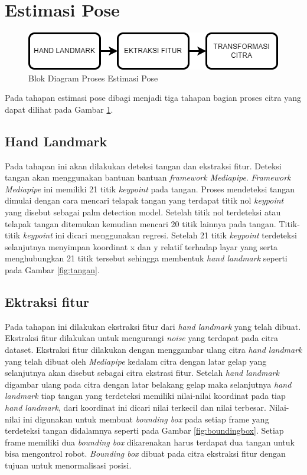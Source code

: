 \section{Estimasi Pose}

\begin{figure}[H]
  \centering
  \includegraphics[width=0.7\linewidth]{../Gambar/Poseestimasi.png}
  \caption{Blok Diagram Proses Estimasi Pose}
  \label{fig:estimasipose}
\end{figure}

Pada tahapan estimasi pose dibagi menjadi tiga tahapan bagian proses citra yang dapat dilihat pada Gambar \ref{fig:estimasipose}. 

\subsection{Hand Landmark}
Pada tahapan ini akan dilakukan deteksi tangan dan ekstraksi fitur. Deteksi tangan akan menggunakan bantuan bantuan \emph{framework Mediapipe}. \emph{Framework Mediapipe} ini memiliki 21 titik  \emph{keypoint} pada tangan. Proses mendeteksi tangan dimulai dengan cara mencari telapak tangan yang terdapat titik nol \emph{keypoint} yang disebut sebagai palm detection model. Setelah titik nol terdeteksi atau telapak tangan ditemukan kemudian mencari 20 titik lainnya pada tangan. Titik-titik \emph{keypoint} ini dicari menggunakan regresi. Setelah 21 titik \emph{keypoint} terdeteksi selanjutnya menyimpan koordinat x dan y relatif terhadap layar yang serta menghubungkan 21 titik tersebut sehingga membentuk \emph{hand landmark} seperti pada Gambar \ref{fig:tangan}. 

\subsection{Ektraksi fitur}
Pada tahapan ini dilakukan ekstraksi fitur dari \emph{hand landmark} yang telah dibuat. Ekstraksi fitur dilakukan untuk mengurangi \emph{noise} yang terdapat pada citra dataset. Ekstraksi fitur dilakukan dengan menggambar ulang citra \emph{hand landmark} yang telah dibuat oleh \emph{Mediapipe} kedalam citra dengan latar gelap yang selanjutnya akan disebut sebagai citra ekstrasi fitur. Setelah \emph{hand landmark} digambar ulang pada citra dengan latar belakang gelap maka selanjutnya \emph{hand landmark} tiap tangan yang terdeteksi memiliki nilai-nilai koordinat pada tiap \emph{hand landmark}, dari koordinat ini dicari nilai terkecil dan nilai terbesar.  Nilai-nilai ini digunakan untuk membuat \emph{bounding box} pada setiap frame yang terdeteksi tangan didalamnya seperti pada Gambar \ref{fig:boundingbox}. Setiap frame memiliki dua \emph{bounding box} dikarenakan harus terdapat dua tangan untuk bisa mengontrol robot. \emph{Bounding box} dibuat pada citra ekstraksi fitur dengan tujuan untuk menormalisasi posisi. 

